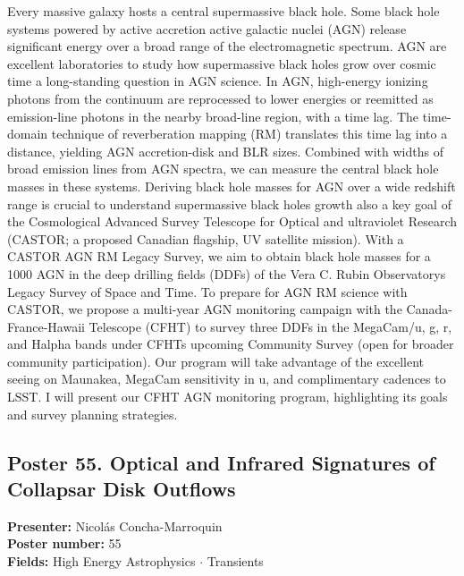 Every massive galaxy hosts a central supermassive black hole. Some black hole systems powered by active accretion active galactic nuclei (AGN) release significant energy over a broad range of the electromagnetic spectrum. AGN are excellent laboratories to study how supermassive black holes grow over cosmic time a long-standing question in AGN science. In AGN, high-energy ionizing photons from the continuum are reprocessed to lower energies or reemitted as emission-line photons in the nearby broad-line region, with a time lag. The time-domain technique of reverberation mapping (RM) translates this time lag into a distance, yielding AGN accretion-disk and BLR sizes. Combined with widths of broad emission lines from AGN spectra, we can measure the central black hole masses in these systems. Deriving black hole masses for AGN over a wide redshift range is crucial to understand supermassive black holes growth also a key goal of the Cosmological Advanced Survey Telescope for Optical and ultraviolet Research (CASTOR; a proposed Canadian flagship, UV satellite mission). With a CASTOR AGN RM Legacy Survey, we aim to obtain black hole masses for a 1000 AGN in the deep drilling fields (DDFs) of the Vera C. Rubin Observatorys Legacy Survey of Space and Time. To prepare for AGN RM science with CASTOR, we propose a multi-year AGN monitoring campaign with the Canada-France-Hawaii Telescope (CFHT) to survey three DDFs in the MegaCam/u, g, r, and Halpha bands under CFHTs upcoming Community Survey (open for broader community participation). Our program will take advantage of the excellent seeing on Maunakea, MegaCam sensitivity in u, and complimentary cadences to LSST. I will present our CFHT AGN monitoring program, highlighting its goals and survey planning strategies.

\hypertarget{poster-abstract-talk-141}{}\label{poster-abstract-page-talk-141}
\subsection*{Poster 55. Optical and Infrared Signatures of Collapsar Disk Outflows}
\textbf{Presenter:} Nicolás Concha-Marroquin\\
\textbf{Poster number:} 55\\
\textbf{Fields:} High Energy Astrophysics $\cdot$ Transients

